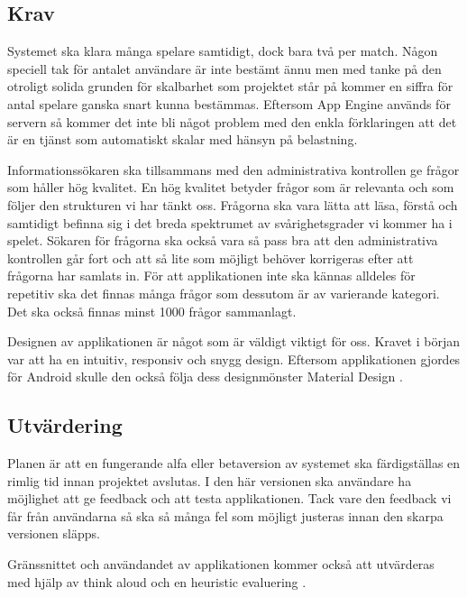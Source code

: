 \documentclass[a4paper, 11pt]{article}
\begin{document}
\subsection{Krav}
Systemet ska klara många spelare samtidigt, dock bara två per match. Någon speciell tak för antalet användare är inte bestämt ännu men med tanke på den otroligt solida grunden för skalbarhet som projektet står på kommer en siffra för antal spelare ganska snart kunna bestämmas. Eftersom App Engine används för servern så kommer det inte bli något problem med den enkla förklaringen att det är en tjänst som automatiskt skalar med hänsyn på belastning. \cite{appenginescalability}

Informationssökaren ska tillsammans med den administrativa kontrollen ge frågor som håller hög kvalitet. En hög kvalitet betyder frågor som är relevanta och som följer den strukturen vi har tänkt oss. Frågorna ska vara lätta att läsa, förstå och samtidigt befinna sig i det breda spektrumet av svårighetsgrader vi kommer ha i spelet. Sökaren för frågorna ska också vara så pass bra att den administrativa kontrollen går fort och att så lite som möjligt behöver korrigeras efter att frågorna har samlats in. För att applikationen inte ska kännas alldeles för repetitiv ska det finnas många frågor som dessutom är av varierande kategori. Det ska också finnas minst 1000 frågor sammanlagt.

Designen av applikationen är något som är väldigt viktigt för oss. Kravet i början var att ha en intuitiv, responsiv och snygg design. Eftersom applikationen gjordes för Android skulle den också följa dess designmönster Material Design \cite{MaterialDesign}.

\subsection{Utvärdering}
Planen är att en fungerande alfa eller betaversion av systemet ska färdigställas en rimlig tid innan projektet avslutas. I den här versionen ska användare ha möjlighet att ge feedback och att testa applikationen. Tack vare den feedback vi får från användarna så ska så många fel som möjligt justeras innan den skarpa versionen släpps.

Gränssnittet och användandet av applikationen kommer också att utvärderas med hjälp av think aloud \cite{thinkaloud} och en heuristic evaluering \cite{heruistic}.

\newpage
\printbibliography[title={Referenser}]
\end{document}
